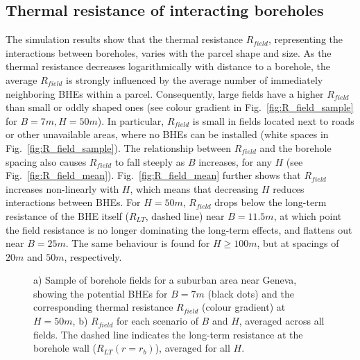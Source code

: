\subsection{Thermal resistance of interacting boreholes}

The simulation results show that the thermal resistance $R_{field}$, representing the interactions between boreholes, 
varies with the parcel shape and size. 
As the thermal resistance decreases logarithmically with distance to a borehole, the average $R_{field}$ is strongly influenced by the average number of immediately neighboring BHEs within a parcel.
Consequently, large fields have a higher $R_{field}$ than small or oddly shaped ones (see colour gradient in Fig.~\ref{fig:R_field_sample} for $B=7m,H=50m$).
In particular, $R_{field}$ is small in fields located next to roads or other unavailable areas, where no BHEs can be installed (white spaces in Fig.~\ref{fig:R_field_sample}). 
%
The relationship between $R_{field}$ and the borehole spacing also causes $R_{field}$ to fall steeply as $B$ increases, for any $H$ (see Fig.~\ref{fig:R_field_mean}).
Fig.~\ref{fig:R_field_mean} further shows that $R_{field}$ increases non-linearly with $H$, which means that decreasing $H$ reduces interactions between BHEs.
%
For $H = 50m$, $R_{field}$ drops below the long-term resistance of the BHE itself ($R_{LT}$, dashed line) near $B = 11.5m$, at which point the field resistance is no longer dominating the long-term effects, and flattens out near $B = 25m$. 
The same behaviour is found for $H \geq 100m$, but at spacings of $20m$ and $50m$, respectively.

\begin{figure}[tb]
\centering
{}
\caption{a) Sample of borehole fields for a suburban area near Geneva, showing the potential BHEs for $B = 7m$ (black dots) and the corresponding thermal resistance $R_{field}$ (colour gradient) at $H = 50m$, b) $R_{field}$ for each scenario of $B$ and $H$, averaged across all fields. The dashed line indicates the long-term resistance at the borehole wall ($R_{LT}(r=r_b)$), averaged for all $H$.}
\label{fig:R_field}
\end{figure}

